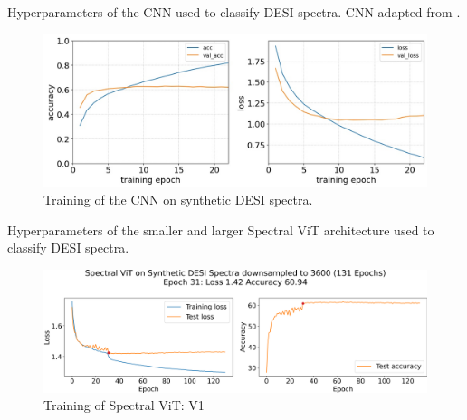 \begin{frame}
    \begin{table}[t!]
        \small
        \centering
        \sffamily
        
        \caption{Hyperparameters of the CNN used to classify DESI spectra. CNN adapted 
        from \textcite{Sepeku2022}.}
        \label{tab:cnn_hyperparameters}
    \end{table}
    \begin{figure}[b!]
        \centering
        \includegraphics[width=.85\linewidth]{figures/cnn/cnn_training_history.jpg}
        \caption[CNN Training]{Training of the CNN on synthetic DESI spectra.}
        \label{fig:cnn_training}
    \end{figure}
\end{frame}


\begin{frame}
    \begin{table}[t!]
        \small
        \centering
        \sffamily
        
        \caption{Hyperparameters of the smaller and larger Spectral ViT architecture used to classify DESI spectra.}
        \label{tab:t_hyper}
    \end{table}
    
    \begin{figure}[b!]
        \centering
        \includegraphics[width=.85\linewidth]{figures/v1_real/vit_model_V1_original_redotraining_new.png}
        \caption{Training of Spectral ViT: V1}
        \label{fig:vit1_training}
    \end{figure}
\end{frame}


